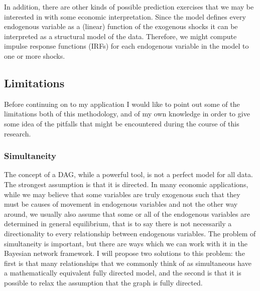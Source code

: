 \documentclass{article}
\begin{document}
In addition, there are other kinds of possible prediction exercises that we may be interested in with some economic interpretation. Since the model defines every endogenous variable as a (linear) function of the exogenous shocks it can be interpreted as a structural model of the data. Therefore, we might compute impulse response functions (IRFs) for each endogenous variable in the model to one or more shocks.

\subsection{Limitations}

Before continuing on to my application I would like to point out some of the limitations both of this methodology, and of my own knowledge in order to give some idea of the pitfalls that might be encountered during the course of this research. 

\subsubsection{Simultaneity}

The concept of a DAG, while a powerful tool, is not a perfect model for all data. The strongest assumption is that it is directed. In many economic applications, while we may believe that some variables are truly exogenous such that they must be causes of movement in endogenous variables and not the other way around, we usually also assume that some or all of the endogenous variables are determined in general equilibrium, that is to say there is not necessarily a directionality to every relationship between endogenous variables. The problem of simultaneity is important, but there are ways which we can work with it in the Bayesian network framework. I will propose two solutions to this problem: the first is that many relationships that we commonly think of as simultaneous have a mathematically equivalent fully directed model, and the second is that it is possible to relax the assumption that the graph is fully directed.
\end{document}
